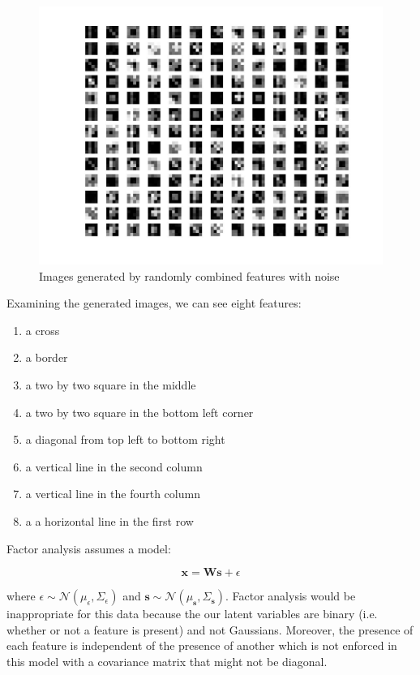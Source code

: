 \documentclass[12pt]{article}
\begin{document}
\begin{figure}[h]
\centering
\includegraphics[scale=0.4]{data/images}
\caption{Images generated by randomly combined features with noise}
\label{fig:3d-images}
\end{figure}

Examining the generated images, we can see eight features:
\begin{enumerate}[\hspace{2cm}(1)]
\item a cross
\item a border
\item a two by two square in the middle
\item a two by two square in the bottom left corner
\item a diagonal from top left to bottom right
\item a vertical line in the second column
\item a vertical line in the fourth column
\item a a horizontal line in the first row
\end{enumerate}

Factor analysis assumes a model:

\[\textbf{x} = \textbf{W}\textbf{s} + \epsilon\]

where $\epsilon \sim \mathcal{N}(\mu_{\epsilon}, \Sigma_{\epsilon})$ and $\textbf{s} \sim \mathcal{N}(\mu_{\textbf{s}}, \Sigma_{\textbf{s}})$. Factor analysis would be inappropriate for this data because the our latent variables are binary (i.e. whether or not a feature is present) and not Gaussians. Moreover, the presence of each feature is independent of the presence of another which is not enforced in this model with a covariance matrix that might not be diagonal.
\end{document}
